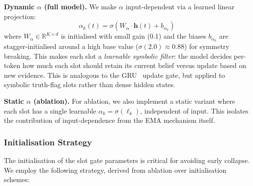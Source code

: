 \documentclass[conference]{IEEEtran}
\newcommand{\Real}{\mathbb{R}}
\begin{document}
\textbf{Dynamic $\alpha$ (full model).}
We make $\alpha$ input-dependent via a learned linear projection:
\begin{equation}
    \alpha_k(t) = \sigma\!\left(
    W_\alpha \cdot \mathbf{h}(t) + b_{\alpha_k}
    \right)
\label{eq:dynamic_alpha}
\end{equation}
where $W_\alpha \in \Real^{K \times d}$ is initialised with small
gain (0.1) and the biases $b_{\alpha_k}$ are stagger-initialised
around a high base value ($\sigma(2.0) \approx 0.88$) for symmetry
breaking.  This makes each slot a \emph{learnable symbolic filter}:
the model decides per-token how much each slot should retain its
current belief versus update based on new evidence.  This is
analogous to the GRU~\cite{cho2014gru} update gate, but applied
to symbolic truth-flag slots rather than dense hidden states.

\textbf{Static $\alpha$ (ablation).}
For ablation, we also implement a static variant where each slot
has a single learnable $\alpha_k = \sigma(\ell_k)$, independent
of input.  This isolates the contribution of input-dependence from
the EMA mechanism itself.

\subsubsection{Initialisation Strategy}
\label{sec:init}

The initialisation of the slot gate parameters is critical for
avoiding early collapse.  We employ the following strategy, derived
from ablation over initialisation schemes:
\end{document}

